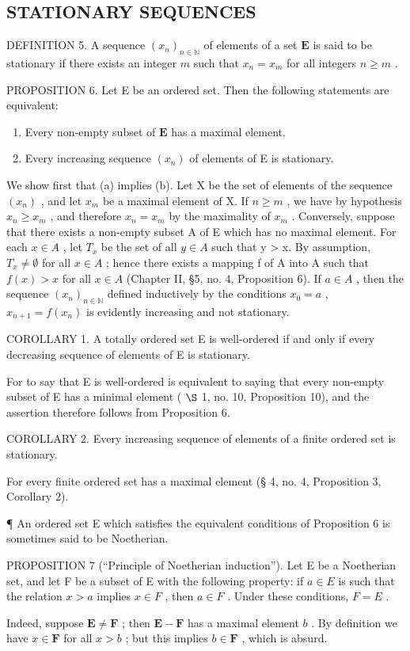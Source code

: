 \subsection{STATIONARY SEQUENCES}

DEFINITION 5. A sequence \((x_{n})_{n\in \mathbb{N}}\) of elements of a set \(\mathbf{E}\) is said to be stationary if there exists an integer \(m\) such that \(x_{n} = x_{m}\) for all integers \(n\geqslant m\) .

PROPOSITION 6. Let E be an ordered set. Then the following statements are equivalent:

\begin{enumerate}
\def\labelenumi{(\alph{enumi})}
\item
  Every non-empty subset of \(\mathbf{E}\) has a maximal element.
\item
  Every increasing sequence \((x_{n})\) of elements of E is stationary.
\end{enumerate}

We show first that (a) implies (b). Let X be the set of elements of the sequence \((x_{n})\) , and let \(x_{m}\) be a maximal element of X. If \(n \geqslant m\) , we have by hypothesis \(x_{n} \geqslant x_{m}\) , and therefore \(x_{n} = x_{m}\) by the maximality of \(x_{m}\) . Conversely, suppose that there exists a non-empty subset A of E which has no maximal element. For each \(x \in A\) , let \(T_{x}\) be the set of all \(y \in A\) such that y \textgreater{} x. By assumption, \(T_{x} \neq \emptyset\) for all \(x \in A\) ; hence there exists a mapping f of A into A such that \(f(x) > x\) for all \(x \in A\) (Chapter II, §5, no. 4, Proposition 6). If \(a \in A\) , then the sequence \((x_{n})_{n \in \mathbb{N}}\) defined inductively by the conditions \(x_{0} = a\) , \(x_{n+1} = f(x_{n})\) is evidently increasing and not stationary.

COROLLARY 1. A totally ordered set E is well-ordered if and only if every decreasing sequence of elements of E is stationary.

For to say that E is well-ordered is equivalent to saying that every non-empty subset of E has a minimal element ( \(\S\) 1, no. 10, Proposition 10), and the assertion therefore follows from Proposition 6.

COROLLARY 2. Every increasing sequence of elements of a finite ordered set is stationary.

For every finite ordered set has a maximal element (§ 4, no. 4, Proposition 3, Corollary 2).

¶ An ordered set E which satisfies the equivalent conditions of Proposition 6 is sometimes said to be Noetherian.

PROPOSITION 7 (``Principle of Noetherian induction''). Let E be a Noetherian set, and let F be a subset of E with the following property: if \(a \in E\) is such that the relation \(x > a\) implies \(x \in F\) , then \(a \in F\) . Under these conditions, \(F = E\) .

Indeed, suppose \(\mathbf{E} \neq \mathbf{F}\) ; then \(\mathbf{E} - \mathbf{F}\) has a maximal element \(b\) . By definition we have \(x \in \mathbf{F}\) for all \(x > b\) ; but this implies \(b \in \mathbf{F}\) , which is absurd.

